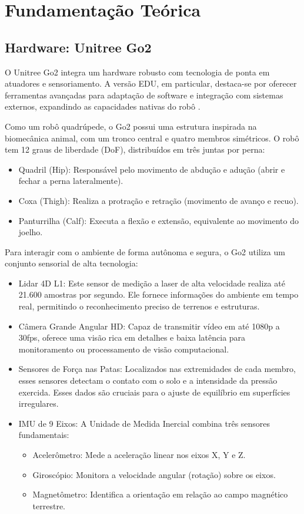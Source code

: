
\chapter{Fundamentação Teórica}

\section{Hardware: Unitree Go2}
O Unitree Go2 integra um hardware robusto com tecnologia de ponta em atuadores e 
sensoriamento. A versão EDU, em particular, destaca-se por oferecer ferramentas 
avançadas para adaptação de software e integração com sistemas externos, 
expandindo as capacidades nativas do robô \cite{unitree2024go2}.

Como um robô quadrúpede, o Go2 possui uma estrutura inspirada na biomecânica 
animal, com um tronco central e quatro membros simétricos. O robô tem 12 graus de 
liberdade (DoF), distribuídos em três juntas por perna:

\begin{itemize}
    \item Quadril (Hip): Responsável pelo movimento de abdução e adução (abrir 
    e fechar a perna lateralmente).
    \item Coxa (Thigh): Realiza a protração e retração (movimento de avanço e 
    recuo).
    \item Panturrilha (Calf): Executa a flexão e extensão, equivalente ao 
    movimento do joelho.
\end{itemize}

Para interagir com o ambiente de forma autônoma e segura, o Go2 utiliza um 
conjunto sensorial de alta tecnologia:

\begin{itemize}
    \item Lidar 4D L1: Este sensor de medição a laser de alta velocidade realiza 
    até 21.600 amostras por segundo. Ele fornece informações do ambiente em tempo 
    real, permitindo o reconhecimento preciso de terrenos e estruturas.
    \item Câmera Grande Angular HD: Capaz de transmitir vídeo em  até 1080p a 
    30fps, oferece uma visão rica em detalhes e baixa latência para monitoramento 
    ou processamento de visão computacional.
    \item Sensores de Força nas Patas: Localizados nas extremidades de cada 
    membro, esses sensores detectam o contato com o solo e a intensidade da 
    pressão exercida. Esses dados são cruciais para o ajuste de equilíbrio em 
    superfícies irregulares.
    \item IMU de 9 Eixos: A Unidade de Medida 
    Inercial combina três sensores fundamentais:
    \begin{itemize}
        \item Acelerômetro: Mede a aceleração linear nos eixos X, Y e Z.
        \item Giroscópio: Monitora a velocidade angular (rotação) sobre os eixos.
        \item Magnetômetro: Identifica a orientação em relação ao campo magnético terrestre.
    \end{itemize}
\end{itemize}

